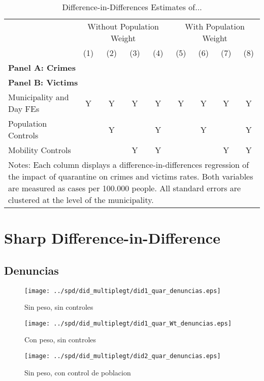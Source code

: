 \documentclass[11pt,letterpaper]{article}
\begin{document}
\begin{landscape}
  \begin{table}
    \centering
    \caption{Difference-in-Differences Estimates of...} \label{tab:DD}
    \begin{tabular}{lcccccccc} \toprule
      &\multicolumn{4}{c}{Without Population Weight}&\multicolumn{4}{c}{With Population Weight} \\ 
      \cmidrule(r){2-5}\cmidrule(r){6-9}
      &(1)&(2)&(3)&(4)&(5)&(6)&(7)&(8) \\ \midrule
      \multicolumn{9}{l}{\textbf{Panel A: Crimes}} \\
       \midrule
      \multicolumn{9}{l}{\textbf{Panel B: Victims}} \\
      
      \midrule
      Municipality and Day FEs &Y&Y&Y&Y&Y&Y&Y&Y \\
      Population Controls      & &Y& &Y& &Y& &Y \\
      Mobility Controls        & & &Y&Y& & &Y&Y \\
      \bottomrule
      \multicolumn{9}{p{21.8cm}}{{\footnotesize Notes: Each column displays a difference-in-differences regression of the impact of quarantine on crimes and victims rates. Both variables are measured as cases per 100.000 people.  All standard errors are clustered at the level of the municipality.}}
    \end{tabular}
  \end{table}
\end{landscape}

\section{Sharp Difference-in-Difference}
	\subsection{Denuncias}
\begin{figure}[hbtp]
\caption{Sin peso, sin controles}
\centering
\texttt{[image: ../spd/did\_multiplegt/did1\_quar\_denuncias.eps]}
\end{figure}

\begin{figure}[hbtp]
\caption{Con peso, sin controles}
\centering
\texttt{[image: ../spd/did\_multiplegt/did1\_quar\_Wt\_denuncias.eps]}
\end{figure}
\begin{figure}[hbtp]
\caption{Sin peso, con control de poblacion}
\centering
\texttt{[image: ../spd/did\_multiplegt/did2\_quar\_denuncias.eps]}
\end{figure}
\end{document}
